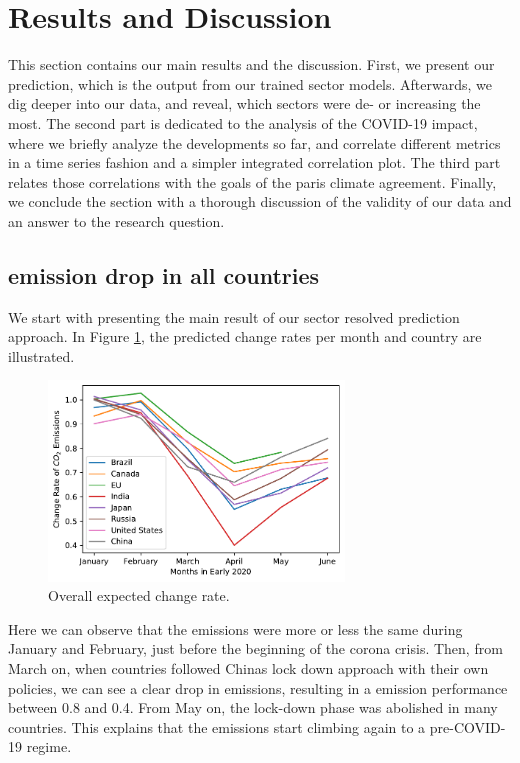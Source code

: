 \section{Results and Discussion}

This section contains our main results and the discussion. First, we present our \co prediction, which is the output from our trained sector models. Afterwards, we dig deeper into our data, and reveal, which sectors were de- or increasing the most. The second part is dedicated to the analysis of the COVID-19 impact, where we briefly analyze the developments so far, and correlate different metrics in a time series fashion and a simpler integrated correlation plot. The third part relates those correlations with the goals of the paris climate agreement. Finally, we conclude the section with a thorough discussion of the validity of our data and an answer to the research question.

\subsection*{\co emission drop in all countries}

We start with presenting the main result of our sector resolved \co prediction approach. In Figure \ref{fig:expected_change_rate}, the predicted change rates per month and country are illustrated.

\begin{figure}[H]
	\centering
	\includegraphics[width=0.7\textwidth]{img/change_rate.pdf}
	\caption{Overall expected change rate.}
	\label{fig:expected_change_rate}
\end{figure}

Here we can observe that the emissions were more or less the same during January and February, just before the beginning of the corona crisis. Then, from March on, when countries followed Chinas lock down approach with their own policies, we can see a clear drop in emissions, resulting in a \co emission performance between 0.8 and 0.4. From May on, the lock-down phase was abolished in many countries. This explains that the emissions start climbing again to a pre-COVID-19 regime.

